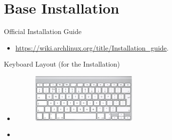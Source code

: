 
\section{Base Installation}

\begin{frame}[fragile]{Official Installation Guide}
  \begin{itemize}
    \item \url{https://wiki.archlinux.org/title/Installation_guide}.
  \end{itemize}
\end{frame}

\begin{frame}[fragile]{Keyboard Layout (for the Installation)}
  \begin{itemize}
    \item {}
    \begin{figure}
      \includegraphics[width=0.5\textwidth]{./figures/keyboard.png}
    \end{figure}
    \item {}
  \end{itemize}
\end{frame}


